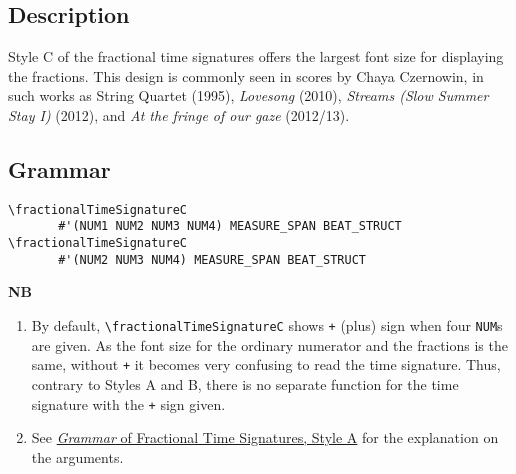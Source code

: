 \hfill
{}
\hfill

\subsection{Description}
Style C of the fractional time signatures offers the largest font size for displaying the fractions. This design is commonly seen in scores by Chaya Czernowin, in such works as String Quartet (1995),\autocite{RN1749}  \textit{Lovesong} (2010),\autocite{RN1751} \textit{Streams (Slow Summer Stay I)} (2012),\autocite{RN1750}  and \textit{At the fringe of our gaze} (2012/13).\autocite{RN1752}  

\subsection{Grammar}
\begin{verbatim}
\fractionalTimeSignatureC 
       #'(NUM1 NUM2 NUM3 NUM4) MEASURE_SPAN BEAT_STRUCT
\fractionalTimeSignatureC 
       #'(NUM2 NUM3 NUM4) MEASURE_SPAN BEAT_STRUCT
\end{verbatim}
\textbf{NB} 
\begin{enumerate}
\item By default, \verb|\fractionalTimeSignatureC| shows \verb|+| (plus) sign when four \verb|NUM|s are given. As the font size for the ordinary numerator and the fractions is the same, without \verb|+| it becomes very confusing to read the time signature. Thus, contrary to Styles A and B, there is no separate function for the time signature with the \verb|+| sign given.
\item See \hyperref[sec:time_signatures_styleA_convention]{\textit{Grammar} of Fractional Time Signatures, Style A} for the explanation on the arguments.
\end{enumerate}
